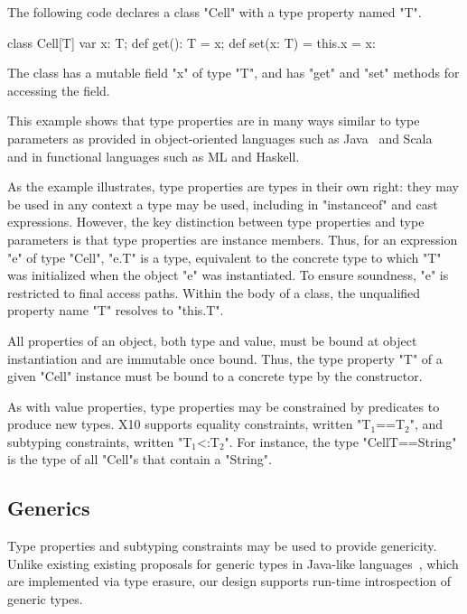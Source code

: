 \documentclass[preprint,nocopyrightspace,9pt]{sigplanconf}
\begin{document}
The following code declares a class \xcd"Cell" with a type
property named \xcd"T".
\begin{xten}
class Cell[T] {
    var x: T;
    def get(): T = x;
    def set(x: T) = { this.x = x: }
}
\end{xten}
The class has a mutable field \xcd"x" of type \Xcd"T",
and has \xcd"get" and \xcd"set" methods for accessing the field.

This example shows that type properties are in many ways similar to
type parameters as provided in object-oriented languages such as
Java~\cite{Java3} and Scala~\cite{Scala} and in functional languages such as ML and
Haskell.

As the example illustrates,
type properties are types in their own right:
they may be used in any context a type may be used,
including in \xcd"instanceof" and cast expressions.
%
However, the key distinction between type properties
and type parameters is that type properties are instance
members.
Thus, for an expression \xcd"e" of type \xcd"Cell", \xcd"e.T" is
a type, equivalent to the concrete type to which \xcd"T" was
initialized when the object \xcd"e" was instantiated.
To ensure
soundness, \xcd"e" is restricted to final access paths.
Within the body of a class, the unqualified property name \xcd"T" resolves
to \xcd"this.T".

All properties of an object, both type and value, must be bound at object
instantiation and are immutable once bound.  Thus, the type
property \Xcd"T" of a given \Xcd"Cell" instance must be bound to 
a concrete type by the constructor.

As with value properties, type properties may be constrained
by predicates to produce new types.
X10 supports
equality constraints, written \xcdmath"T$_1$==T$_2$", and
subtyping constraints, written \xcdmath"T$_1$<:T$_2$".
For instance, the type \xcd"Cell{T==String}" is the type of
all \xcd"Cell"s that contain a \xcd"String".

\subsection{Generics}

Type properties and subtyping constraints may be used to 
provide genericity.  Unlike existing 
existing proposals for generic types in
Java-like
languages~\cite{Java3,adding-wildcards,GJ,Pizza,polyj,thorup97,allen03,allen04,csharp,emir06,scala},
which 
are implemented via type erasure,
our design supports run-time introspection of generic types.
\end{document}
